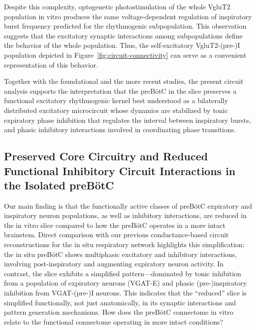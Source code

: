 \documentclass[
]{article}
\newcommand{\figref}[1]{Figure~\ref{#1}}
\begin{document}
Despite this complexity, optogenetic photostimulation of the whole VgluT2 population in vitro produces the same voltage-dependent regulation of inspiratory burst frequency \citep{phillips2022predictions} predicted for the rhythmogenic subpopulation. This observation suggests that the excitatory synaptic interactions among subpopulations define the behavior of the whole population. Thus, the self-excitatory VgluT2-(pre-)I population depicted in \figref{fig:circuit-connectivity} can serve as a convenient representation of this behavior.

Together with the foundational \citep{johnson1994pacemaker,johnson2001island,koizumi2013structural} and the more recent studies, the present circuit analysis supports the interpretation that the preBötC in the slice preserves a functional excitatory rhythmogenic kernel best understood as a bilaterally distributed excitatory microcircuit whose dynamics are stabilized by tonic expiratory phase inhibition that regulates the interval between inspiratory bursts, and phasic inhibitory interactions involved in coordinating phase transitions.

\subsection{Preserved Core Circuitry and Reduced Functional Inhibitory Circuit Interactions in the Isolated preBötC}\label{preserved-core-circuitry-and-reduced-functional-inhibitory-circuit-interactions-in-the-isolated-prebuxf6tc}

Our main finding is that the functionally active classes of preBötC expiratory and inspiratory neuron populations, as well as inhibitory interactions, are reduced in the in vitro slice compared to how the preBötC operates in a more intact brainstem. Direct comparison with our previous conductance-based circuit reconstructions for the in situ respiratory network \citep[][\figref{fig:preserved-core-circuitry} below]{molkov2024inference} highlights this simplification: the in situ preBötC shows multiphasic excitatory and inhibitory interactions, involving post-inspiratory and augmenting expiratory neuron activity. In contrast, the slice exhibits a simplified pattern---dominated by tonic inhibition from a population of expiratory neurons (VGAT-E) and phasic (pre-)inspiratory inhibition from VGAT-(pre-)I neurons. This indicates that the ``reduced'' slice is simplified functionally, not just anatomically, in its synaptic interactions and pattern generation mechanisms. How does the preBötC connectome in vitro relate to the functional connectome operating in more intact conditions?
\end{document}
